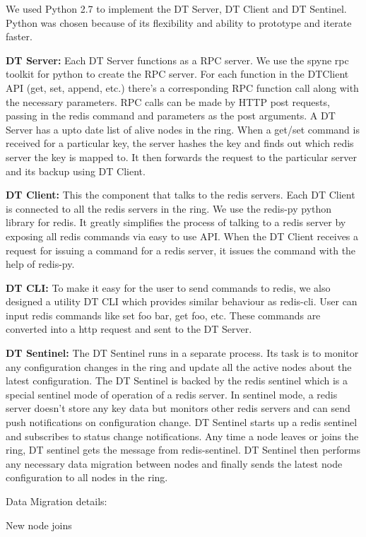 \documentclass[10pt,twocolumn,letterpaper]{article}
\begin{document}
We used Python 2.7 to implement the DT Server, DT Client and DT Sentinel. Python was chosen because of its flexibility and ability to prototype and iterate faster. 

\textbf{DT Server:} Each DT Server functions as a RPC server. We use the spyne rpc toolkit for python to create the RPC server. For each function in the DTClient API (get, set, append, etc.) there's a corresponding RPC function call along with the necessary parameters. RPC calls can be made by HTTP post requests, passing in the redis command and parameters as the post arguments. A DT Server has a upto date list of alive nodes in the ring. When a get/set command is received for a particular key, the server hashes the key and finds out which redis server the key is mapped to. It then forwards the request to the particular server and its backup using DT Client.

\textbf{DT Client: }This the component that talks to the redis servers. Each DT Client is connected to all the redis servers in the ring. We use the redis-py python library for redis. It greatly simplifies the process of talking to a redis server by exposing all redis commands via easy to use API. When the DT Client receives a request for issuing a command for a redis server, it issues the command with the help of redis-py.

\textbf{DT CLI:} To make it easy for the user to send commands to redis, we also designed a utility DT CLI which provides similar behaviour as redis-cli. User can input redis commands like set foo bar, get foo, etc. These commands are converted into a http request and sent to the DT Server. 

\textbf{DT Sentinel:} The DT Sentinel runs in a separate process. Its task is to monitor any configuration changes in the ring and update all the active nodes about the latest configuration. The DT Sentinel is backed by the redis sentinel which is a special sentinel mode of operation of a redis server. In sentinel mode, a redis server doesn't store any key data but monitors other redis servers and can send push notifications on configuration change. DT Sentinel starts up a redis sentinel and subscribes to status change notifications. Any time a node leaves or joins the ring, DT sentinel gets the message from redis-sentinel. DT Sentinel then performs any necessary data migration between nodes and finally sends the latest node configuration to all nodes in the ring.

Data Migration details: 

New node joins
\end{document}
